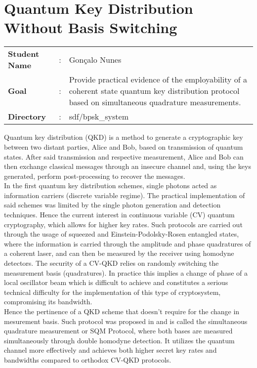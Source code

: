 \clearpage
\section{Quantum Key Distribution Without Basis Switching}

\begin{refsection}

\begin{tcolorbox}	
\begin{tabular}{p{2.75cm} p{0.2cm} p{10.5cm}} 	
\textbf{Student Name}  &:&  Gonçalo Nunes\\
\textbf{Goal}          &:& Provide practical evidence of the employability of a coherent state quantum key distribution protocol based on simultaneous quadrature measurements.\\
\textbf{Directory}              &:& sdf/bpsk\_system
\end{tabular}
\end{tcolorbox}
Quantum key distribution (QKD) is a method to generate a cryptographic key between two distant parties, Alice and Bob, based on transmission of quantum states. After said transmission and respective measurement, Alice and Bob can then exchange classical messages through an insecure channel and, using the keys generated, perform post-processing to recover the messages.\\ 
In the first quantum key distribution schemes, single photons acted as information carriers (discrete variable regime). The practical implementation of said schemes was limited by the single photon generation and detection techniques. Hence the current interest in continuous variable (CV) quantum cryptography, which allows for higher key rates. Such protocols are carried out through the usage of squeezed and Einstein-Podolsky-Rosen entangled states, where the information is carried through the amplitude and phase quadratures of a coherent laser, and can  then  be  measured  by  the  receiver  using  homodyne detectors. The security of a CV-QKD relies on randomly switching the measurement basis (quadratures). In practice this implies a change of phase of a local oscillator beam which is difficult to achieve and constitutes a serious technical difficulty for the implementation of this type of cryptosystem, compromising its bandwidth.\\
Hence the pertinence of a QKD scheme that doesn't require for the change in mesurement basis. Such protocol was proposed in \cite{Weedbrook2004} and is called the simultaneous quadrature measurement or SQM Protocol, where both bases are measured simultaneously through double homodyne detection. It utilizes the quantum channel more effectively and achieves both higher secret key rates and bandwidths compared to orthodox CV-QKD protocols.

\end{refsection}
